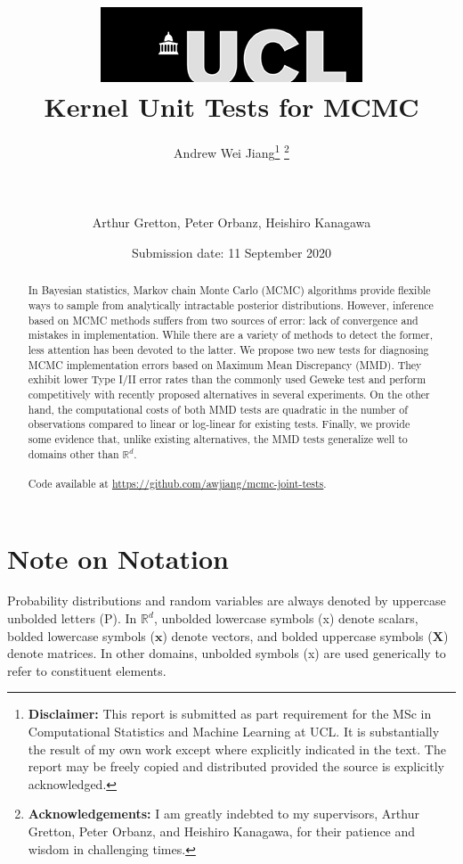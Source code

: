 \documentclass[a4paper,11pt]{article}
\title{  	{ \includegraphics[scale=.5]{figures/ucl_logo.png}}\\
{{\Huge Kernel Unit Tests for MCMC}}\\
		}
\date{Submission date: 11 September 2020}
\author{Andrew Wei Jiang\thanks{
{\bf Disclaimer:}
This report is submitted as part requirement for the MSc in Computational Statistics and Machine Learning at UCL. It is
substantially the result of my own work except where explicitly indicated in the text. The report may be freely copied and distributed provided the source is explicitly acknowledged.
\newline}
\thanks{
{\bf Acknowledgements:}
I am greatly indebted to my supervisors, Arthur Gretton, Peter Orbanz, and Heishiro Kanagawa, for their patience and wisdom in challenging times.
\newline}
\\ \\
\\ \\
Arthur Gretton, Peter Orbanz, Heishiro Kanagawa}
\begin{document}
\maketitle
\thispagestyle{empty}
\onehalfspacing

\newpage
\begin{abstract}
    In Bayesian statistics, Markov chain Monte Carlo (MCMC) algorithms provide flexible ways to sample from analytically intractable posterior distributions. However, inference based on MCMC methods suffers from two sources of error: lack of convergence and mistakes in implementation. While there are a variety of methods to detect the former, less attention has been devoted to the latter. We propose two new tests for diagnosing MCMC implementation errors based on Maximum Mean Discrepancy (MMD). They exhibit lower Type I/II error rates than the commonly used Geweke test \cite{geweke_getting_2004} and perform competitively with recently proposed alternatives in several experiments. On the other hand, the computational costs of both MMD tests are quadratic in the number of observations compared to linear or log-linear for existing tests. Finally, we provide some evidence that, unlike existing alternatives, the MMD tests generalize well to domains other than $\mathbb{R}^{d}$.
    \\
    \\
    Code available at \hyperref[https://github.com/awjiang/mcmc-joint-tests]{https://github.com/awjiang/mcmc-joint-tests}.
\end{abstract}
\setcounter{page}{1}
\newpage

\tableofcontents
\newpage

\section*{Note on Notation}
Probability distributions and random variables are always denoted by uppercase unbolded letters (P). In $\mathbb{R}^{d}$, unbolded lowercase symbols (x) denote scalars, bolded lowercase symbols ($\mathbf{x}$) denote vectors, and bolded uppercase symbols ($\mathbf{X}$) denote matrices. In other domains, unbolded symbols (x) are used generically to refer to constituent elements.
\end{document}
